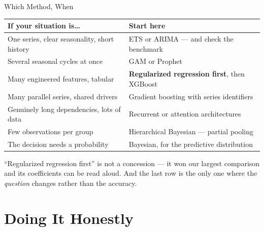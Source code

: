 \documentclass[aspectratio=169, 11pt]{beamer}
\begin{document}
\begin{frame}{Which Method, When}
  \begin{center}
    {\small
    \begin{tabular}{p{4.6cm}p{7.7cm}}
      \toprule
      \textbf{If your situation is\ldots} & \textbf{Start here} \\
      \midrule
      One series, clear seasonality, short history & ETS or ARIMA --- and check the benchmark \\[1pt]
      Several seasonal cycles at once & GAM or Prophet \\[1pt]
      Many engineered features, tabular & \textbf{Regularized regression first}, then XGBoost \\[1pt]
      Many parallel series, shared drivers & Gradient boosting with series identifiers \\[1pt]
      Genuinely long dependencies, lots of data & Recurrent or attention architectures \\[1pt]
      Few observations per group & Hierarchical Bayesian --- partial pooling \\[1pt]
      The decision needs a probability & Bayesian, for the predictive distribution \\
      \bottomrule
    \end{tabular}
    }
  \end{center}

  \vspace{0.05cm}
  ``Regularized regression first'' is not a concession --- it won our largest comparison and its
  coefficients can be read aloud. And the last row is the only one where the \emph{question}
  changes rather than the accuracy.
\end{frame}

\section{Doing It Honestly}

\end{document}
